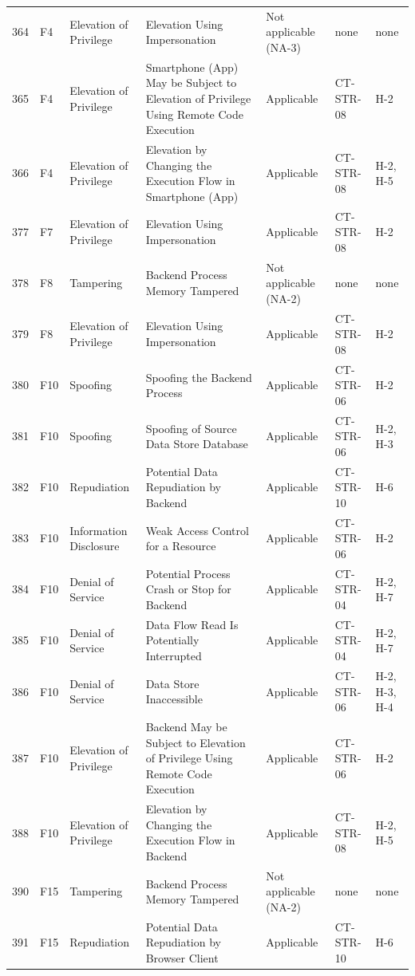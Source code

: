 \begin{footnotesize}
\begin{longtable}{l l p{} p{} p{} l p{}}
        364 & F4 & Elevation of Privilege & Elevation Using Impersonation & Not applicable (NA-3) & none & none \\
        365 & F4 & Elevation of Privilege & Smartphone (App) May be Subject to Elevation of Privilege Using Remote Code Execution & Applicable & CT-STR-08 & H-2 \\
        366 & F4 & Elevation of Privilege & Elevation by Changing the Execution Flow in Smartphone (App) & Applicable & CT-STR-08 & H-2, H-5 \\
        377 & F7 & Elevation of Privilege & Elevation Using Impersonation & Applicable & CT-STR-08 & H-2 \\
        378 & F8 & Tampering & Backend Process Memory Tampered & Not applicable (NA-2) & none & none \\
        379 & F8 & Elevation of Privilege & Elevation Using Impersonation & Applicable & CT-STR-08 & H-2 \\
        380 & F10 & Spoofing & Spoofing the Backend Process & Applicable & CT-STR-06 & H-2 \\
        381 & F10 & Spoofing & Spoofing of Source Data Store Database & Applicable & CT-STR-06 & H-2, H-3 \\
        382 & F10 & Repudiation & Potential Data Repudiation by Backend & Applicable & CT-STR-10 & H-6 \\
        383 & F10 & Information Disclosure & Weak Access Control for a Resource & Applicable & CT-STR-06 & H-2 \\
        384 & F10 & Denial of Service & Potential Process Crash or Stop for Backend & Applicable & CT-STR-04 & H-2, H-7 \\
        385 & F10 & Denial of Service & Data Flow Read Is Potentially Interrupted & Applicable & CT-STR-04 & H-2, H-7 \\
        386 & F10 & Denial of Service & Data Store Inaccessible & Applicable & CT-STR-06 & H-2, H-3, H-4 \\
        387 & F10 & Elevation of Privilege & Backend May be Subject to Elevation of Privilege Using Remote Code Execution & Applicable & CT-STR-06 & H-2 \\
        388 & F10 & Elevation of Privilege & Elevation by Changing the Execution Flow in Backend & Applicable & CT-STR-08 & H-2, H-5 \\
        390 & F15 & Tampering & Backend Process Memory Tampered & Not applicable (NA-2) & none & none \\
        391 & F15 & Repudiation & Potential Data Repudiation by Browser Client & Applicable & CT-STR-10 & H-6 \\

\end{longtable}
\end{footnotesize}
